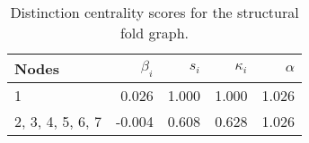 \begin{table}
\centering
\caption{\label{tab:sf}Distinction centrality scores for the structural fold graph.}
\centering
\begin{tabular}[t]{lrrrr}
\toprule
Nodes & $\beta_i$ & $s_i$ & $\kappa_i$ & $\alpha$\\
\midrule
1 & 0.026 & 1.000 & 1.000 & 1.026\\
2, 3, 4, 5, 6, 7 & -0.004 & 0.608 & 0.628 & 1.026\\
\bottomrule
\end{tabular}
\end{table}
